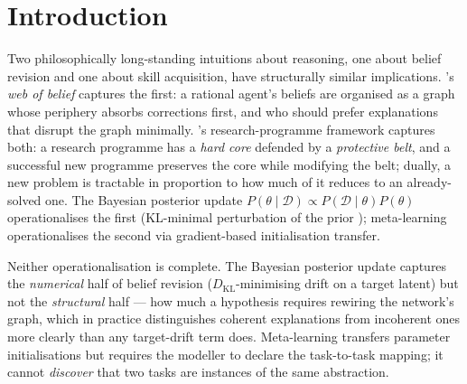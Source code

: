 \documentclass{article}
\begin{document}
\begin{abstract}
\textbf{Scope (honest up front).} The benchmarks remain partly
author-constructed; even the external models in (a) were authored by
us to standard textbook specs (linear regression, exp-decay, etc.)
rather than imported from a third-party PyMC gallery. LLM panels
contain no human raters. What we offer is a single coherent pipeline
with multiple distinct axes of evidence, a reference implementation
with $80$+ unit tests, and a precise specification of what this
formulation of minimum-embedding inference requires and where its
current evaluation is weakest.
\end{abstract}

\section{Introduction}
\label{sec:intro}

Two philosophically long-standing intuitions about reasoning, one
about belief revision and one about skill acquisition, have
structurally similar implications.
\citet{quine1951twodogmas}'s \emph{web of belief} captures the first:
a rational agent's beliefs are organised as a graph whose periphery
absorbs corrections first, and who should prefer explanations that
disrupt the graph minimally. \citet{lakatos1970}'s research-programme
framework captures both: a research programme has a \emph{hard core}
defended by a \emph{protective belt}, and a successful new
programme preserves the core while modifying the belt; dually, a
new problem is tractable in proportion to how much of it reduces to
an already-solved one. The Bayesian posterior update
$P(\theta \mid \mathcal{D}) \propto P(\mathcal{D} \mid \theta) P(\theta)$
operationalises the first (KL-minimal perturbation of the prior
\citep{williamsMaximumEntropy}); meta-learning operationalises the
second \citep{finn2017maml} via gradient-based initialisation transfer.

Neither operationalisation is complete. The Bayesian posterior
update captures the \emph{numerical} half of belief revision
($D_{\mathrm{KL}}$-minimising drift on a target latent) but not the
\emph{structural} half --- how much a hypothesis requires rewiring
the network's graph, which in practice distinguishes coherent
explanations from incoherent ones more clearly than any
target-drift term does. Meta-learning transfers parameter
initialisations but requires the modeller to declare the task-to-task
mapping; it cannot \emph{discover} that two tasks are instances of
the same abstraction.
\end{document}
